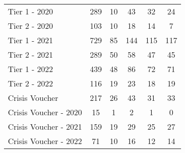 \begin{tabular}{l|c|c|c|c|c}
\midrule 
\quad Tier 1 - 2020 & 289 & 10 & 43 & 32 & 24 \\
\quad Tier 2 - 2020 & 103 & 10 & 18 & 14 & 7 \\
\quad Tier 1 - 2021 & 729 & 85 & 144 & 115 & 117 \\
\quad Tier 2 - 2021 & 289 & 50 & 58 & 47 & 45 \\
\quad Tier 1 - 2022 & 439 & 48 & 86 & 72 & 71 \\
\quad Tier 2 - 2022 & 116 & 19 & 23 & 18 & 19 \\
\midrule 
Crisis Voucher & 217 & 26 & 43 & 31 & 33 \\
\quad Crisis Voucher - 2020 & 15 & 1 & 2 & 1 & 0 \\
\quad Crisis Voucher - 2021 & 159 & 19 & 29 & 25 & 27 \\
\quad Crisis Voucher - 2022 & 71 & 10 & 16 & 12 & 14 \\
\midrule 
\bottomrule 
\end{tabular}
